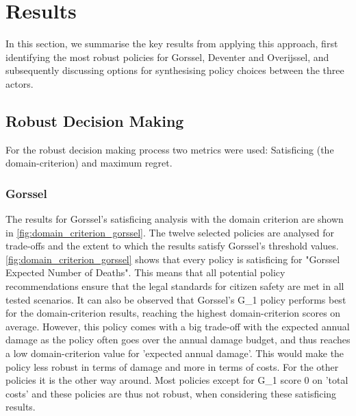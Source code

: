 \section{Results}
\label{s:results}

In this section, we summarise the key results from applying this approach, first identifying the most robust policies for Gorssel, Deventer and Overijssel, and subsequently discussing options for synthesising policy choices between the three actors. 

\subsection{Robust Decision Making}
For the robust decision making process two metrics were used: Satisficing (the domain-criterion) and maximum regret. 
\subsubsection{Gorssel}
The results for Gorssel's satisficing analysis with the domain criterion are shown in \autoref{fig:domain_criterion_gorssel}. The twelve selected policies are analysed for trade-offs and the extent to which the results satisfy Gorssel's threshold values. \newline
\autoref{fig:domain_criterion_gorssel} shows that every policy is satisficing for "Gorssel Expected Number of Deaths". This means that all potential policy recommendations ensure that the legal standards for citizen safety are met in all tested scenarios. 
It can also be observed that Gorssel's G\_1 policy performs best for the domain-criterion results, reaching the highest domain-criterion scores on average. However, this policy comes with a big trade-off with the expected annual damage as the policy often goes over the annual damage budget, and thus reaches a low domain-criterion value for 'expected annual damage'. This would make the policy less robust in terms of damage and more in terms of costs. For the other policies it is the other way around. Most policies except for G\_1 score 0 on 'total costs' and these policies are thus not robust, when considering these satisficing results.  \newline

